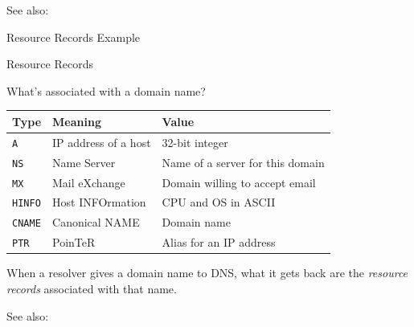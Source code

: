 See also: 

\begin{frame}{Resource Records Example}
  \begin{center}
  \end{center}
\end{frame}

\begin{frame}{Resource Records}
  \begin{block}{What's associated with a domain name?}
    \begin{small}
    \begin{tabular}{@{}llp{}@{}}\toprule
      \textbf{Type}&\textbf{Meaning}&\textbf{Value}\\\midrule
      \texttt{A}&IP address of a host&32-bit integer\\[1ex]
      \texttt{NS}&Name Server&Name of a server for this domain\\[1ex]
      \texttt{MX}&Mail eXchange&Domain willing to accept email\\[1ex]
      \texttt{HINFO}&Host INFOrmation&CPU and OS in ASCII\\[1ex]
      \texttt{CNAME}&Canonical NAME&Domain name\\[1ex]
      \texttt{PTR}&PoinTeR&Alias for an IP address\\\bottomrule
    \end{tabular}
    \end{small}
  \end{block}
  When a resolver gives a domain name to DNS, what it gets back are the \emph{resource records}
  associated with that name.
\end{frame}

See also: 

